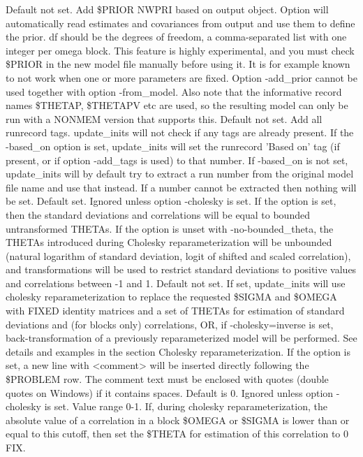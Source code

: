 \begin{optionlist}
Default not set. Add \$PRIOR NWPRI based on output object. Option will automatically read estimates and covariances from output and use them to define the prior. df should be the degrees of freedom, a comma-separated list with one integer per omega block. This feature is highly experimental, and you must check \$PRIOR in the new model file manually before using it. It is for example known to not work when one or more parameters are fixed. Option -add\_prior cannot be used together with option -from\_model. Also note that the informative record names \$THETAP, \$THETAPV etc are used,
so the resulting model can only be run with a NONMEM version that supports this.
\nextopt
{}
Default not set. Add all runrecord tags. update\_inits will not check if any tags are already present.
\nextopt
{}
If the -based\_on option is set, update\_inits will set the runrecord 'Based on' tag (if present, or if option -add\_tags is used) 
to that number. If -based\_on is not set, update\_inits will by default try to extract a run number from the original model file name and use that instead. If a number cannot be extracted then nothing will be set. 
\nextopt	
{}
Default set. Ignored unless option -cholesky is set. If the option is set, then the standard deviations and correlations will be equal to bounded untransformed THETAs. If the option is unset with -no-bounded\_theta, the THETAs introduced during Cholesky reparameterization will be unbounded (natural logarithm of standard deviation, logit of shifted and scaled correlation), and transformations will be used to restrict standard deviations to positive values and correlations between -1 and 1.
\nextopt
{}
Default not set. If set, update\_inits will use cholesky reparameterization to replace the requested \$SIGMA and \$OMEGA with FIXED identity matrices and a set of THETAs for estimation of standard deviations and (for blocks only) correlations, OR, if -cholesky=inverse is set, back-transformation of a previously reparameterized model will be performed. See details and examples in the section Cholesky reparameterization.
\nextopt
{}
If the option is set, a new line with <comment> will be inserted directly following the \$PROBLEM row. The comment text must be enclosed with quotes (double quotes on Windows) if it contains spaces.
\nextopt
{}
Default is 0. Ignored unless option -cholesky is set. Value range 0-1. If, during cholesky reparameterization, the absolute value of a correlation in a block \$OMEGA or \$SIGMA is lower than or equal to this cutoff, then set the \$THETA for estimation of this correlation to 0 FIX.

\end{optionlist}
